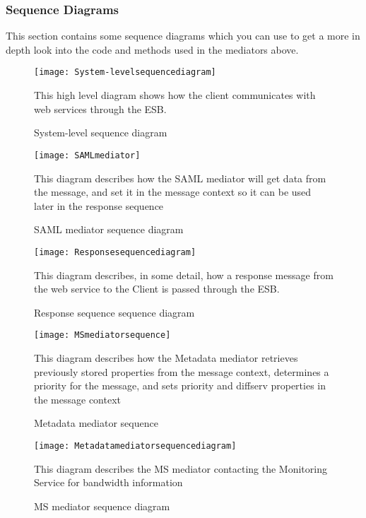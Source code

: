     \subsubsection{Sequence Diagrams}\label{Server Sequence Diagrams}
    This section contains some sequence diagrams which you can use to get a more in depth look into the code and methods used in the mediators above.
    
        \begin{figure}[H]
            \centering
            \texttt{[image: System-levelsequencediagram]}
            \caption{System-level sequence diagram}
            This high level diagram shows how the client communicates with web services through the ESB.
            \label{fig:System-levelsequencediagram}
        \end{figure}
        
        \begin{figure}[H]
            \centering
            \texttt{[image: SAMLmediator]}
            \caption{SAML mediator sequence diagram}
            This diagram describes how the SAML mediator will get data from the message, and set it in the message context so it can be used later in the response sequence
            \label{fig:SAMLmediator}
        \end{figure}
        
        \begin{figure}[H]
            \texttt{[image: Responsesequencediagram]}
            \caption{Response sequence sequence diagram}
            This diagram describes, in some detail, how a response message from the web service to the Client is passed through the ESB.
            \label{fig:Responsesequencediagram}
        \end{figure}
    
        \begin{figure}[H]
            \centering
            \texttt{[image: MSmediatorsequence]}
            \caption{Metadata mediator sequence}
            This diagram describes how the Metadata mediator retrieves previously stored properties from the message context, determines a priority for the message, and sets priority and diffserv properties in the message context
            \label{fig:MSmediatorsequence}
        \end{figure}
        
        \begin{figure}[H]
            \centering
            \texttt{[image: Metadatamediatorsequencediagram]}
            \caption{MS mediator sequence diagram}
            This diagram describes the MS mediator contacting the Monitoring Service for bandwidth information
            \label{fig:Metadatamediatorsequencediagram}
        \end{figure}

